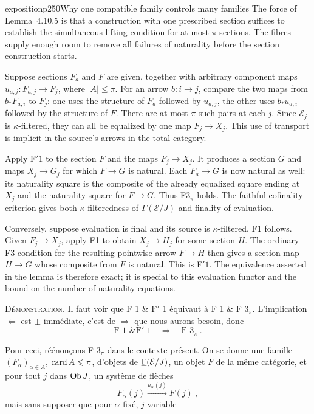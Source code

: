 \begin{dcomment}{exposition}{p250}{Why one compatible family controls many families}
The force of Lemma~4.10.5 is that a construction with one prescribed section suffices to establish the simultaneous lifting condition for at most $\pi$ sections. The fibres supply enough room to remove all failures of naturality before the section construction starts.

Suppose sections $F_a$ and $F$ are given, together with arbitrary component maps $u_{a,j}:F_{a,j}\to F_j$, where $|A|\leq\pi$. For an arrow $b:i\to j$, compare the two maps from $b_*F_{a,i}$ to $F_j$: one uses the structure of $F_a$ followed by $u_{a,j}$, the other uses $b_*u_{a,i}$ followed by the structure of $F$. There are at most $\pi$ such pairs at each $j$. Since $\mathcal E_j$ is $\kappa$-filtered, they can all be equalized by one map $F_j\to X_j$. This use of transport is implicit in the source's arrows in the total category.

Apply F$'1$ to the section $F$ and the maps $F_j\to X_j$. It produces a section $G$ and maps $X_j\to G_j$ for which $F\to G$ is natural. Each $F_a\to G$ is now natural as well: its naturality square is the composite of the already equalized square ending at $X_j$ and the naturality square for $F\to G$. Thus F$3_\pi$ holds. The faithful cofinality criterion gives both $\kappa$-filteredness of $\Gamma(\mathcal E/J)$ and finality of evaluation.

Conversely, suppose evaluation is final and its source is $\kappa$-filtered. F1 follows. Given $F_j\to X_j$, apply F1 to obtain $X_j\to H_j$ for some section $H$. The ordinary F3 condition for the resulting pointwise arrow $F\to H$ then gives a section map $H\to G$ whose composite from $F$ is natural. This is F$'1$. The equivalence asserted in the lemma is therefore exact; it is special to this evaluation functor and the bound on the number of naturality equations.
\end{dcomment}


\textsc{Démonstration}. Il faut voir que F 1 \& F$'$ 1 équivaut à F 1 \& F $3_\pi$. L'implication $\Longleftarrow$ est $\pm$ immédiate, c'est de $\Longrightarrow$ que nous aurons besoin, donc
\[
\text{F 1 \& F}'\text{ 1} \quad\Longrightarrow\quad \text{F } 3_\pi\ .
\]

Pour ceci, réénonçons F $3_\pi$ dans le contexte présent. On se donne une famille $(F_\alpha)_{\alpha\in A}$, $\operatorname{card} A\leqslant\pi$, d'objets de $\underline{\Gamma}(\mathcal{E}/J)$, un objet $F$ de la même catégorie, et pour tout $j$ dans $\operatorname{Ob} J$, un système de flèches
\[
F_\alpha(j) \xrightarrow{u_\alpha(j)} F(j)\ ,
\]
mais sans supposer que pour $\alpha$ fixé, $j$ variable

